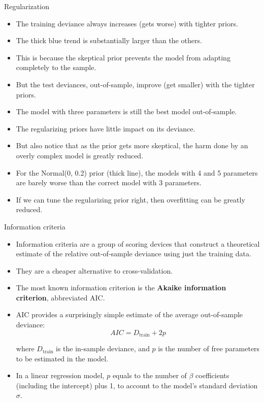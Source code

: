 \documentclass[handout]{beamer}
\begin{document}
\begin{frame}{Regularization}
\scriptsize{


\begin{itemize}

\item The training deviance always increases (gets worse) with tighter priors. 
\item The thick blue trend is substantially larger than the others.

\item This is because the skeptical prior prevents the model from adapting completely to the sample. 
\item But the test deviances, out-of-sample, improve (get smaller) with the tighter priors. 
\item The model with three parameters is still the best model out-of-sample.
\item The regularizing priors have little impact on its deviance.

\item But also notice that as the prior gets more skeptical, the harm done by an overly complex model is greatly reduced.
\item For the Normal(0, 0.2) prior (thick line), the models with 4 and 5 parameters are barely worse than the correct model with 3 parameters. 
\item If we can tune the
regularizing prior right, then overfitting can be greatly reduced.


\end{itemize}


} 
\end{frame}


\begin{frame}{Information criteria}
\scriptsize{

\begin{itemize}
\item Information criteria are a group of scoring devices that construct a theoretical estimate of the relative out-of-sample deviance using just the training data.
\item They are a cheaper alternative to cross-validation.

\item The most known information criterion is the \textbf{Akaike information criterion}, abbreviated AIC. 
\item AIC provides a surprisingly simple estimate of the average out-of-sample deviance:
\begin{equation}
AIC = D_{\text{train}} + 2p 
\end{equation}


where  $D_{\text{train}}$ is the in-sample deviance, and $p$ is the number of free parameters to be estimated in the model.

\item In a linear regression model, $p$ equals to the number of $\beta$ coefficients (including the intercept)  plus 1, to account to the model's standard deviation $\sigma$.


\end{itemize}


} 
\end{frame}
\end{document}
